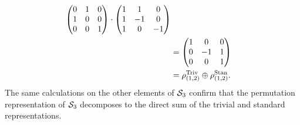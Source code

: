 \begin{example}
\begin{align*}
\begin{pmatrix}
				0&1&0 \\ 1&0&0 \\ 0&0&1
			\end{pmatrix} \cdot \begin{pmatrix}
				1&1&0 \\ 1&-1&0 \\ 1&0&-1
			\end{pmatrix} \\
			&= \begin{pmatrix}
				1&0&0 \\ 0&-1&1 \\ 0&0&1
			\end{pmatrix}\\
			&= \rho_{(1,2)}^{\text{Triv}} \oplus \rho_{(1,2)}^{\text{Stan}}.
		\end{align*}
		The same calculations on the other elements of $\mathcal{S}_3$ confirm that the permutation representation of $\mathcal{S}_3$ decomposes to the direct sum of the trivial and standard representations.
\end{example}

